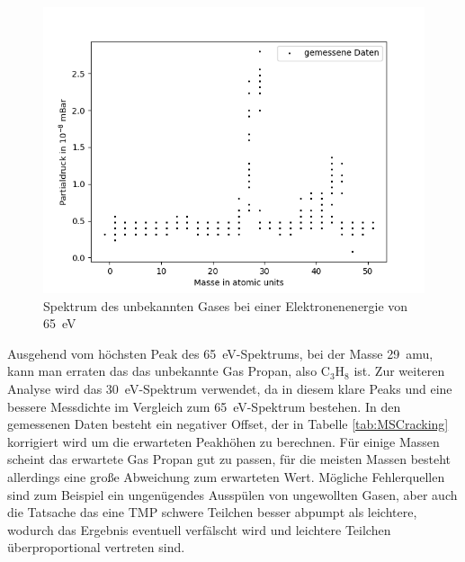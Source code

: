 \begin{figure}[H]
    \centering
    \includegraphics[width=120mm,scale=0.8]{Massenspektrometer/include/MS65eV.png}
    \caption{Spektrum des unbekannten Gases bei einer Elektronenenergie von \SI{65}{eV}}
    \label{fig:MS65eV}
\end{figure}
Ausgehend vom höchsten Peak des \SI{65}{eV}-Spektrums, bei der Masse \SI{29}{amu}, kann man erraten das das unbekannte Gas Propan, also $\text{C}_3
\text{H}_8$ ist. Zur weiteren Analyse wird das \SI{30}{eV}-Spektrum verwendet, da in diesem klare Peaks und eine bessere Messdichte im Vergleich zum \SI{65}{eV}-Spektrum bestehen. In den gemessenen Daten besteht ein negativer Offset, der in Tabelle \ref{tab:MSCracking} korrigiert wird um die erwarteten Peakhöhen zu berechnen. Für einige Massen scheint das erwartete Gas Propan gut zu passen, für die meisten Massen besteht allerdings eine große Abweichung zum erwarteten Wert. Mögliche Fehlerquellen sind zum Beispiel ein ungenügendes Ausspülen von ungewollten Gasen, aber auch die Tatsache das eine TMP schwere Teilchen besser abpumpt als leichtere, wodurch das Ergebnis eventuell verfälscht wird und leichtere Teilchen überproportional vertreten sind. 
